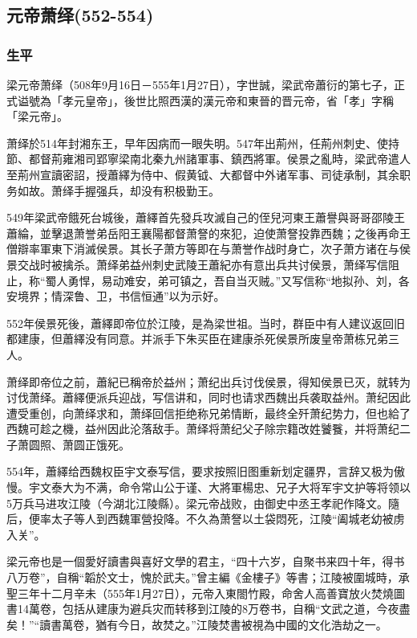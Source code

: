 
\subsection{元帝萧绎\tiny(552-554)}

\subsubsection{生平}

梁元帝萧绎（508年9月16日－555年1月27日），字世誠，梁武帝蕭衍的第七子，正式谥號為「孝元皇帝」，後世比照西漢的漢元帝和東晉的晋元帝，省「孝」字稱「梁元帝」。

萧绎於514年封湘东王，早年因病而一眼失明。547年出荊州，任荊州刺史、使持節、都督荊雍湘司郢寧梁南北秦九州諸軍事、鎮西將軍。侯景之亂時，梁武帝遣人至荊州宣讀密詔，授蕭繹为侍中、假黄钺、大都督中外诸军事、司徒承制，其余职务如故。萧绎手握强兵，却没有积极勤王。

549年梁武帝餓死台城後，蕭繹首先發兵攻滅自己的侄兒河東王蕭譽與哥哥邵陵王蕭綸，並擊退萧誉弟岳阳王襄陽都督萧詧的來犯，迫使萧詧投靠西魏；之後再命王僧辯率軍東下消滅侯景。其长子萧方等即在与萧誉作战时身亡，次子萧方诸在与侯景交战时被擒杀。萧绎弟益州刺史武陵王蕭紀亦有意出兵共讨侯景，萧绎写信阻止，称“蜀人勇悍，易动难安，弟可镇之，吾自当灭贼。”又写信称“地拟孙、刘，各安境界；情深鲁、卫，书信恒通”以为示好。

552年侯景死後，蕭繹即帝位於江陵，是為梁世祖。当时，群臣中有人建议返回旧都建康，但蕭繹没有同意。并派手下朱买臣在建康杀死侯景所废皇帝萧栋兄弟三人。

萧绎即帝位之前，蕭紀已稱帝於益州；萧纪出兵讨伐侯景，得知侯景已灭，就转为讨伐萧绎。蕭繹便派兵迎战，写信讲和，同时也请求西魏出兵袭取益州。萧纪因此遭受重创，向萧绎求和，萧绎回信拒绝称兄弟情断，最终全歼萧纪势力，但也給了西魏可趁之機，益州因此沦落敌手。萧绎将萧纪父子除宗籍改姓饕餮，并将萧纪二子萧圆照、萧圆正饿死。

554年，蕭繹给西魏权臣宇文泰写信，要求按照旧图重新划定疆界，言辞又极为傲慢。宇文泰大为不满，命令常山公于谨、大將軍楊忠、兄子大将军宇文护等将领以5万兵马进攻江陵（今湖北江陵縣）。梁元帝战败，由御史中丞王孝祀作降文。隨后，便率太子等人到西魏軍營投降。不久為萧詧以土袋悶死，江陵“阖城老幼被虏入关”。

梁元帝也是一個愛好讀書與喜好文學的君主，“四十六岁，自聚书来四十年，得书八万卷”，自稱“韜於文士，愧於武夫。”曾主編《金樓子》等書；江陵被圍城時，承聖三年十二月辛未（555年1月27日），元帝入東閤竹殿，命舍人高善寶放火焚燒圖書14萬卷，包括从建康为避兵灾而转移到江陵的8万卷书，自稱“文武之道，今夜盡矣！”“讀書萬卷，猶有今日，故焚之。”江陵焚書被視為中國的文化浩劫之一。


